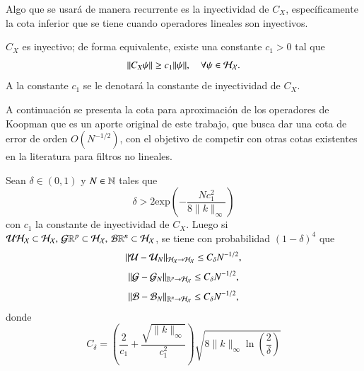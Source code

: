 Algo que se usará de manera recurrente es la inyectividad de $C_X$, específicamente la cota inferior que se tiene cuando operadores lineales son inyectivos.

\begin{lema}
    $C_X$ es inyectivo; de forma equivalente, existe una constante $c_1 > 0$ tal que
    \[
    \| C_X \psi \| \geq c_1 \| \psi \|, \quad \forall \psi \in \mathcal{H}_{\mathcal{X}}.
    \]
    A la constante $c_1$ se le denotará la constante de inyectividad de $C_X$.
\end{lema}


A continuación se presenta la cota para aproximación de los operadores de Koopman que es un aporte original de este trabajo, que busca dar una cota de error de orden $O(N^{-1/2})$, con el objetivo de competir con otras cotas existentes en la literatura para filtros no lineales.

\begin{teo}
\label{teo:error_koop_sqrt_N_def}
Sean $\delta \in (0, 1)$ y $N \in \mathbb{N}$ tales que
\[
\delta > 2 \text{exp} \left ( -\frac{Nc_1^2}{8\|k\|_\infty}\right )
\]
con $c_1$ la constante de inyectividad de $C_X$. Luego si $\mathcal{U} \mathcal{H}_{\mathcal{X}} \subset \mathcal{H}_{\mathcal{X}}, \, \mathcal{G} \mathbb{R}^p \subset \mathcal{H}_{\mathcal{X}}, \, \mathcal{B} \mathbb{R}^n \subset \mathcal{H}_{\mathcal{X}}$, se tiene con probabilidad $(1-\delta)^4$ que 
 \begin{equation}
    \| \mathcal{U} - \mathcal{U}_N \|_{\mathcal{H}_{\mathcal{X}} \to \mathcal{H}_{\mathcal{X}}} \leq C_\delta N^{-1/2},
    \label{eq:kEDMD_bound}
\end{equation}
\begin{equation*}
\| \mathcal{G} - \mathcal{G}_N \|_{\mathbb{R}^p \to \mathcal{H}_{\mathcal{X}}} \leq C_\delta N^{-1/2},
\end{equation*}
\begin{equation*}
\| \mathcal{B} - \mathcal{B}_N \|_{\mathbb{R}^n \to \mathcal{H}_{\mathcal{X}}} \leq C_\delta N^{-1/2},
\end{equation*}
donde 
\[
C_\delta = \left ( \frac{2}{c_1} + \frac{\sqrt{\| k \|_{\infty}}}{c_1^2}
  \right )\sqrt{8 \| k \|_\infty \ln \left ( \frac{2}{\delta}\right ) }
\]
\end{teo}

